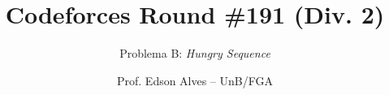 \title{Codeforces Round \#191 (Div. 2)}
\subtitle{Problema B: \it Hungry Sequence}
\author{Prof. Edson Alves -- UnB/FGA}
\date{}
